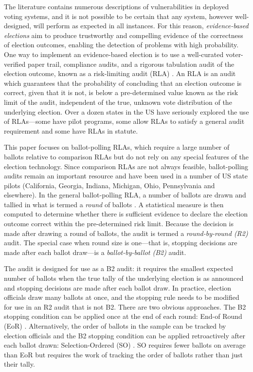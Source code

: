 The literature contains numerous descriptions of vulnerabilities in deployed voting systems, and it is not possible to be certain that any system, however well-designed, will perform as expected in all instances. For this reason, 
{\em evidence-based elections} \cite{evidence-based} aim to produce trustworthy and compelling evidence of the correctness of election outcomes, enabling the detection of problems with high probability. One way to implement an evidence-based election is to use a well-curated voter-verified paper trail, compliance audits, and a rigorous tabulation audit of the election outcome, known as a risk-limiting audit (RLA) \cite{RLA}. An RLA is an audit which guarantees that the probability of concluding that an election outcome is correct, given that it is not, is below a pre-determined value known as the risk limit of the audit, independent of the true, unknown vote distribution of the underlying election. Over a dozen states in the US have seriously explored the use of RLAs---some have pilot programs, some allow RLAs to satisfy a general audit requirement and some have RLAs in statute.     

This paper focuses on ballot-polling RLAs, which require a large number of ballots relative to comparison RLAs but do not rely on any special features of the election technology. Since comparison RLAs are not always feasible, ballot-polling audits remain an important resource and have been used in a number of US state pilots (California, Georgia, Indiana, Michigan, Ohio, Pennsylvania and elsewhere). In the general ballot-polling RLA, a number of ballots are drawn and tallied in what is termed a {\em round} of ballots \cite{usenix_minerva}. A statistical measure is then computed to determine whether there is sufficient evidence to declare the election outcome correct within the pre-determined risk limit. Because the decision is made after drawing a round of ballots, the audit is termed a {\em round-by-round (R2)} audit. The special case when round size is one---that is, stopping decisions are made after each ballot draw---is a {\em ballot-by-ballot (B2)} audit.

The \BRAVO audit is designed for use as a B2 audit: it requires the smallest expected number of ballots when the true tally of the underlying election is as announced and stopping decisions are made after each ballot draw. In practice, election officials draw many ballots at once, and the \BRAVO stopping rule needs to be modified for use in an R2 audit that is not B2. There are two obvious approaches. The B2 stopping condition can be applied once at the end of each round: End-of Round (EoR) \BRAVO.  Alternatively, the order of ballots in the sample can be tracked by election officials and the B2 \BRAVO stopping condition can be applied retroactively after each ballot drawn: Selection-Ordered (SO) \BRAVO. SO \BRAVO requires fewer ballots on average than EoR \BRAVO but requires the work of tracking the order of ballots rather than just their tally. 

